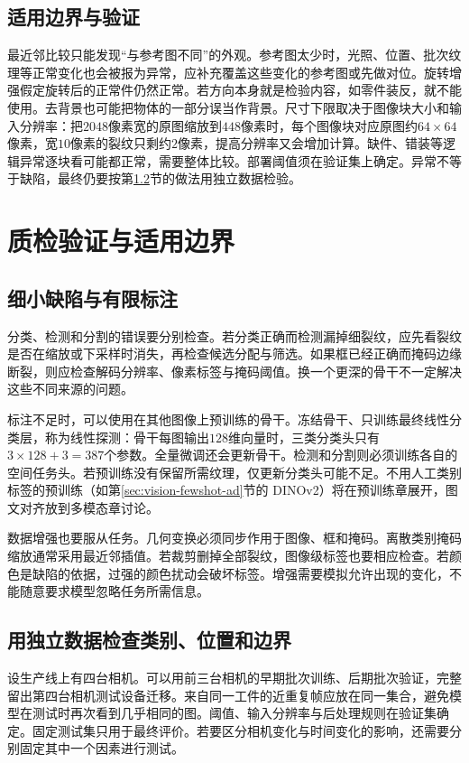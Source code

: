 \subsection{适用边界与验证}
最近邻比较只能发现“与参考图不同”的外观。参考图太少时，光照、位置、批次纹理等正常变化也会被报为异常，应补充覆盖这些变化的参考图或先做对位。旋转增强假定旋转后的正常件仍然正常。若方向本身就是检验内容，如零件装反，就不能使用。去背景也可能把物体的一部分误当作背景。尺寸下限取决于图像块大小和输入分辨率：把$2048$像素宽的原图缩放到$448$像素时，每个图像块对应原图约$64\times64$像素，宽$10$像素的裂纹只剩约$2$像素，提高分辨率又会增加计算。缺件、错装等逻辑异常逐块看可能都正常，需要整体比较。部署阈值须在验证集上确定。异常不等于缺陷，最终仍要按第\ref{sec:vision-validation}节的做法用独立数据检验。

\section{质检验证与适用边界}
\subsection{细小缺陷与有限标注}
分类、检测和分割的错误要分别检查。若分类正确而检测漏掉细裂纹，应先看裂纹是否在缩放或下采样时消失，再检查候选分配与筛选。如果框已经正确而掩码边缘断裂，则应检查解码分辨率、像素标签与掩码阈值。换一个更深的骨干不一定解决这些不同来源的问题。

标注不足时，可以使用在其他图像上预训练的骨干。冻结骨干、只训练最终线性分类层，称为线性探测：骨干每图输出$128$维向量时，三类分类头只有$3\times128+3=387$个参数。全量微调还会更新骨干。检测和分割则必须训练各自的空间任务头。若预训练没有保留所需纹理，仅更新分类头可能不足。不用人工类别标签的预训练（如第\ref{sec:vision-fewshot-ad}节的 DINOv2）将在预训练章展开，图文对齐放到多模态章讨论。

数据增强也要服从任务。几何变换必须同步作用于图像、框和掩码。离散类别掩码缩放通常采用最近邻插值。若裁剪删掉全部裂纹，图像级标签也要相应检查。若颜色是缺陷的依据，过强的颜色扰动会破坏标签。增强需要模拟允许出现的变化，不能随意要求模型忽略任务所需信息。

\subsection{用独立数据检查类别、位置和边界}
\label{sec:vision-validation}
设生产线上有四台相机。可以用前三台相机的早期批次训练、后期批次验证，完整留出第四台相机测试设备迁移。来自同一工件的近重复帧应放在同一集合，避免模型在测试时再次看到几乎相同的图。阈值、输入分辨率与后处理规则在验证集确定。固定测试集只用于最终评价。若要区分相机变化与时间变化的影响，还需要分别固定其中一个因素进行测试。

